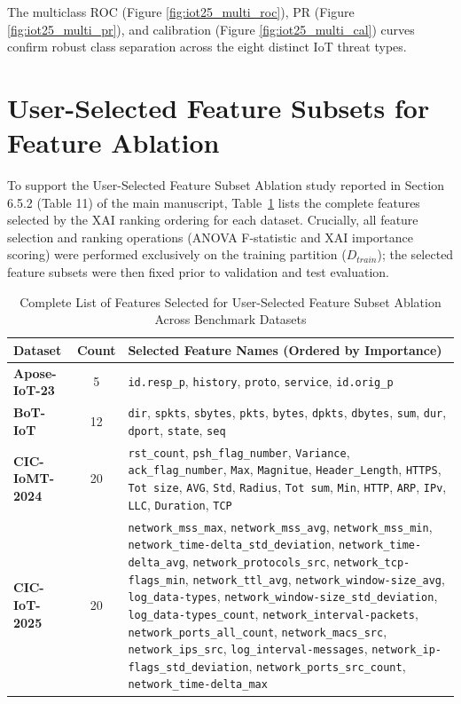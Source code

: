 \documentclass[a4paper,fleqn]{cas-sc}
\begin{document}
The multiclass ROC (Figure \ref{fig:iot25_multi_roc}), PR (Figure \ref{fig:iot25_multi_pr}), and calibration (Figure \ref{fig:iot25_multi_cal}) curves confirm robust class separation across the eight distinct IoT threat types.


\section{User-Selected Feature Subsets for Feature Ablation}
\label{sec:supp_feature_ablation}

To support the User-Selected Feature Subset Ablation study reported in Section 6.5.2 (Table 11) of the main manuscript, Table~\ref{tab:supp_feature_subsets} lists the complete features selected by the XAI ranking ordering for each dataset. Crucially, all feature selection and ranking operations (ANOVA F-statistic and XAI importance scoring) were performed exclusively on the training partition ($D_{train}$); the selected feature subsets were then fixed prior to validation and test evaluation.

\begin{table}
\centering
\caption{Complete List of Features Selected for User-Selected Feature Subset Ablation Across Benchmark Datasets}
\label{tab:supp_feature_subsets}
\begin{tabular}{lcp{12cm}}
\toprule
\textbf{Dataset} & \textbf{Count} & \textbf{Selected Feature Names (Ordered by Importance)} \\
\midrule
\textbf{Apose-IoT-23} & 5 & \texttt{id.resp\_p}, \texttt{history}, \texttt{proto}, \texttt{service}, \texttt{id.orig\_p} \\
\midrule
\textbf{BoT-IoT} & 12 & \texttt{dir}, \texttt{spkts}, \texttt{sbytes}, \texttt{pkts}, \texttt{bytes}, \texttt{dpkts}, \texttt{dbytes}, \texttt{sum}, \texttt{dur}, \texttt{dport}, \texttt{state}, \texttt{seq} \\
\midrule
\textbf{CIC-IoMT-2024} & 20 & \texttt{rst\_count}, \texttt{psh\_flag\_number}, \texttt{Variance}, \texttt{ack\_flag\_number}, \texttt{Max}, \texttt{Magnitue}, \texttt{Header\_Length}, \texttt{HTTPS}, \texttt{Tot size}, \texttt{AVG}, \texttt{Std}, \texttt{Radius}, \texttt{Tot sum}, \texttt{Min}, \texttt{HTTP}, \texttt{ARP}, \texttt{IPv}, \texttt{LLC}, \texttt{Duration}, \texttt{TCP} \\
\midrule
\textbf{CIC-IoT-2025} & 20 & \texttt{network\_mss\_max}, \texttt{network\_mss\_avg}, \texttt{network\_mss\_min}, \texttt{network\_time-delta\_std\_deviation}, 
\texttt{network\_time-delta\_avg}, \texttt{network\_protocols\_src}, \texttt{network\_tcp-flags\_min}, \texttt{network\_ttl\_avg}, 
\texttt{network\_window-size\_avg}, \texttt{log\_data-types}, \texttt{network\_window-size\_std\_deviation}, 
 \texttt{log\_data-types\_count}, \texttt{network\_interval-packets}, \texttt{network\_ports\_all\_count}, 
 \texttt{network\_macs\_src}, \texttt{network\_ips\_src}, \texttt{log\_interval-messages}, 
 \texttt{network\_ip-flags\_std\_deviation}, \texttt{network\_ports\_src\_count}, \texttt{network\_time-delta\_max} \\
\bottomrule
\end{tabular}
\end{table}
\end{document}
